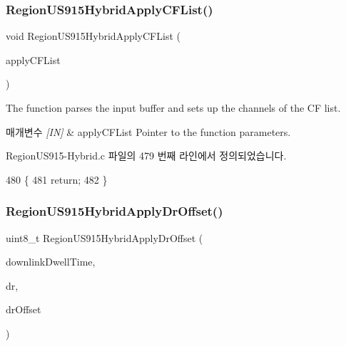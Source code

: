 \subsubsection{\texorpdfstring{Region\+U\+S915\+Hybrid\+Apply\+C\+F\+List()}{RegionUS915HybridApplyCFList()}}
{\footnotesize\ttfamily void Region\+U\+S915\+Hybrid\+Apply\+C\+F\+List (\begin{DoxyParamCaption}\item[{\mbox{\hyperlink{group___r_e_g_i_o_n_ga71588e9ad07e34b78fa91d51881fd3c6}{Apply\+C\+F\+List\+Params\+\_\+t}} $\ast$}]{apply\+C\+F\+List }\end{DoxyParamCaption})}



The function parses the input buffer and sets up the channels of the CF list. 


\begin{DoxyParams}{매개변수}
{\em \mbox{[}\+I\+N\mbox{]}} & apply\+C\+F\+List Pointer to the function parameters. \\
\hline
\end{DoxyParams}


Region\+U\+S915-\/\+Hybrid.\+c 파일의 479 번째 라인에서 정의되었습니다.


\begin{DoxyCode}
480 \{
481     \textcolor{keywordflow}{return};
482 \}
\end{DoxyCode}
\mbox{\label{group___r_e_g_i_o_n_u_s915_h_y_b_gaa90275764dd76f7122c3253d2eab2c2f}} 
\subsubsection{\texorpdfstring{Region\+U\+S915\+Hybrid\+Apply\+Dr\+Offset()}{RegionUS915HybridApplyDrOffset()}}
{\footnotesize\ttfamily uint8\+\_\+t Region\+U\+S915\+Hybrid\+Apply\+Dr\+Offset (\begin{DoxyParamCaption}\item[{uint8\+\_\+t}]{downlink\+Dwell\+Time,  }\item[{int8\+\_\+t}]{dr,  }\item[{int8\+\_\+t}]{dr\+Offset }\end{DoxyParamCaption})}



